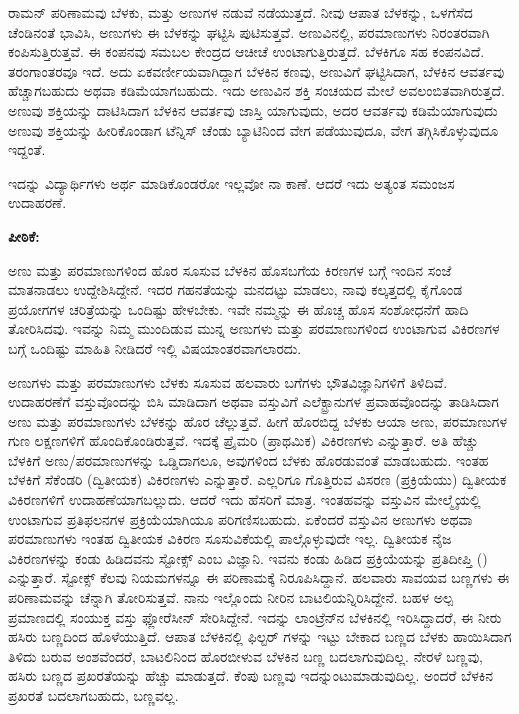 ರಾಮನ್ ಪರಿಣಾಮವು ಬೆಳಕು, ಮತ್ತು ಅಣುಗಳ ನಡುವೆ ನಡೆಯುತ್ತದೆ. ನೀವು ಆಪಾತ ಬೆಳಕನ್ನು, ಒಳಗೆಸೆದ ಚೆಂಡಿನಂತೆ ಭಾವಿಸಿ, ಅಣುಗಳು ಈ ಬೆಳಕನ್ನು ಘಟ್ಟಿಸಿ ಪುಟಿಸುತ್ತವೆ. ಅಣುವಿನಲ್ಲಿ, ಪರಮಾಣುಗಳು ನಿರಂತರವಾಗಿ ಕಂಪಿಸುತ್ತಿರುತ್ತವೆ. ಈ ಕಂಪನವು ಸಮಬಲ ಕೇಂದ್ರದ ಆಚೀಚೆ ಉಂಟಾಗುತ್ತಿರುತ್ತದೆ. ಬೆಳಕಿಗೂ ಸಹ ಕಂಪನವಿದೆ. ತರಂಗಾಂತರವೂ ಇದೆ. ಅದು ಏಕವರ್ಣೀಯವಾಗಿದ್ದಾಗ ಬೆಳಕಿನ ಕಣವು, ಅಣುವಿಗೆ ಘಟ್ಟಿಸಿದಾಗ, ಬೆಳಕಿನ ಆವರ್ತವು ಹೆಚ್ಚಾಗಬಹುದು ಅಥವಾ ಕಡಿಮೆಯಾಗಬಹುದು. ಇದು ಅಣುವಿನ ಶಕ್ತಿ ಸಂಚಯದ ಮೇಲೆ ಅವಲಂಬಿತವಾಗಿರುತ್ತದೆ. ಅಣುವು ಶಕ್ತಿಯನ್ನು ದಾಟಿಸಿದಾಗ ಬೆಳಕಿನ ಆವರ್ತವು ಜಾಸ್ತಿ ಯಾಗುವುದು, ಅದರ ಆವರ್ತವು ಕಡಿಮೆಯಾಗುವುದು  ಅಣುವು ಶಕ್ತಿಯನ್ನು ಹೀರಿಕೊಂಡಾಗ ಟೆನ್ನಿಸ್ ಚೆಂಡು ಬ್ಯಾಟಿನಿಂದ ವೇಗ ಪಡೆಯುವುದೂ, ವೇಗ ತಗ್ಗಿಸಿಕೊಳ್ಳುವುದೂ ಇದ್ದಂತೆ.

ಇದನ್ನು ವಿದ್ಯಾರ್ಥಿಗಳು ಅರ್ಥ ಮಾಡಿಕೊಂಡರೋ ಇಲ್ಲವೋ ನಾ ಕಾಣೆ. ಆದರೆ ಇದು ಅತ್ಯಂತ ಸಮಂಜಸ ಉದಾಹರಣೆ.



\textbf{ಪೀಠಿಕೆ:}

ಅಣು ಮತ್ತು ಪರಮಾಣುಗಳಿಂದ ಹೊರ ಸೂಸುವ ಬೆಳಕಿನ ಹೊಸಬಗೆಯ ಕಿರಣಗಳ ಬಗ್ಗೆ ಇಂದಿನ ಸಂಜೆ ಮಾತನಾಡಲು ಉದ್ದೇಶಿಸಿದ್ದೇನೆ. ಇದರ ಗಹನತೆಯನ್ನು ಮನದಟ್ಟು ಮಾಡಲು, ನಾವು ಕಲ್ಕತ್ತದಲ್ಲಿ ಕೈಗೊಂಡ ಪ್ರಯೋಗಗಳ ಚರಿತ್ರೆಯನ್ನು ಒಂದಿಷ್ಟು ಹೇಳಬೇಕು. ಇವೇ ನಮ್ಮನ್ನು ಈ ಹೊಚ್ಚ ಹೊಸ ಸಂಶೋಧನೆಗೆ ಹಾದಿ ತೋರಿಸಿದವು. ಇವನ್ನು ನಿಮ್ಮ ಮುಂದಿಡುವ ಮುನ್ನ ಅಣುಗಳು ಮತ್ತು ಪರಮಾಣುಗಳಿಂದ ಉಂಟಾಗುವ ವಿಕಿರಣಗಳ ಬಗ್ಗೆ ಒಂದಿಷ್ಟು ಮಾಹಿತಿ ನೀಡಿದರೆ ಇಲ್ಲಿ ವಿಷಯಾಂತರವಾಗಲಾರದು.

ಅಣುಗಳು ಮತ್ತು ಪರಮಾಣುಗಳು ಬೆಳಕು ಸೂಸುವ ಹಲವಾರು ಬಗೆಗಳು ಭೌತವಿಜ್ಞಾನಿಗಳಿಗೆ ತಿಳಿದಿವೆ. ಉದಾಹರಣೆಗೆ ವಸ್ತುವೊಂದನ್ನು ಬಿಸಿ ಮಾಡಿದಾಗ ಅಥವಾ ವಸ್ತುವಿಗೆ ಎಲೆಕ್ಟ್ರಾನುಗಳ ಪ್ರವಾಹವೊಂದನ್ನು ತಾಡಿಸಿದಾಗ ಅಣು ಮತ್ತು ಪರಮಾಣುಗಳು ಬೆಳಕನ್ನು ಹೊರ ಚೆಲ್ಲುತ್ತವೆ. ಹೀಗೆ ಹೊರಬಿದ್ದ ಬೆಳಕು ಆಯಾ ಅಣು, ಪರಮಾಣುಗಳ ಗುಣ ಲಕ್ಷಣಗಳಿಗೆ ಹೊಂದಿಕೊಂಡಿರುತ್ತವೆ. ಇದಕ್ಕೆ ಪ್ರೈಮರಿ (ಪ್ರಾಥಮಿಕ) ವಿಕಿರಣಗಳು ಎನ್ನುತ್ತಾರೆ. ಅತಿ ಹೆಚ್ಚು ಬೆಳಕಿಗೆ ಅಣು/ಪರಮಾಣುಗಳನ್ನು ಒಡ್ಡಿದಾಗಲೂ, ಅವುಗಳಿಂದ ಬೆಳಕು ಹೊರಡುವಂತೆ ಮಾಡಬಹುದು. ಇಂತಹ ಬೆಳಕಿಗೆ ಸೆಕೆಂಡರಿ (ದ್ವಿತೀಯಕ) ವಿಕಿರಣಗಳು ಎನ್ನುತ್ತಾರೆ. ಎಲ್ಲರಿಗೂ ಗೊತ್ತಿರುವ ವಿಸರಣ (ಪ್ರಕ್ರಿಯೆಯು) ದ್ವಿತೀಯಕ ವಿಕಿರಣಗಳಿಗೆ ಉದಾಹಣೆಯಾಗಬಲ್ಲುದು. ಆದರೆ ಇದು ಹೆಸರಿಗೆ ಮಾತ್ರ. ಇಂತಹವನ್ನು ವಸ್ತುವಿನ ಮೇಲ್ಮೈಯಲ್ಲಿ ಉಂಟಾಗುವ ಪ್ರತಿಫಲನಗಳ ಪ್ರಕ್ರಿಯೆಯಾಗಿಯೂ ಪರಿಗಣಿಸಬಹುದು. ಏಕೆಂದರೆ ವಸ್ತುವಿನ ಅಣುಗಳು ಅಥವಾ ಪರಮಾಣುಗಳು ಇಂತಹ ದ್ವಿತೀಯಕ ವಿಕಿರಣ ಸೂಸುವಿಕೆಯಲ್ಲಿ ಪಾಲ್ಗೊಳ್ಳುವುದೇ ಇಲ್ಲ. ದ್ವಿತೀಯಕ ನೈಜ ವಿಕಿರಣಗಳನ್ನು ಕಂಡು ಹಿಡಿದವನು ಸ್ಟೋಕ್ಸ್ ಎಂಬ ವಿಜ್ಞಾನಿ. ಇವನು ಕಂಡು ಹಿಡಿದ ಪ್ರಕ್ರಿಯೆಯನ್ನು ಪ್ರತಿದೀಪ್ತಿ () ಎನ್ನುತ್ತಾರೆ. ಸ್ಟೋಕ್ಸ್ ಕೆಲವು ನಿಯಮಗಳನ್ನೂ ಈ ಪರಿಣಾಮಕ್ಕೆ ನಿರೂಪಿಸಿದ್ದಾನೆ. ಹಲವಾರು ಸಾವಯವ ಬಣ್ಣಗಳು ಈ ಪರಿಣಾಮವನ್ನು ಚೆನ್ನಾಗಿ ತೋರಿಸುತ್ತವೆ. ನಾನು ಇಲ್ಲೊಂದು ನೀರಿನ ಬಾಟಲಿಯನ್ನಿರಿಸಿದ್ದೇನೆ. ಬಹಳ ಅಲ್ಪ ಪ್ರಮಾಣದಲ್ಲಿ ಸಂಯುಕ್ತ ವಸ್ತು ಫ್ಲೋರೆಸೀನ್ ಸೇರಿಸಿದ್ದೇನೆ. ಇದನ್ನು ಲಾಂಟ್ರೆನ್‍ನ ಬೆಳಕಿನಲ್ಲಿ ಇರಿಸಿದ್ದಾದರೆ, ಈ ನೀರು ಹಸಿರು ಬಣ್ಣದಿಂದ ಹೊಳೆಯುತ್ತಿದೆ. ಆಪಾತ ಬೆಳಕಿನಲ್ಲಿ ಫಿಲ್ಟರ್ ಗಳನ್ನು ಇಟ್ಟು ಬೇಕಾದ ಬಣ್ಣದ ಬೆಳಕು ಹಾಯಿಸಿದಾಗ ತಿಳಿದು ಬರುವ ಅಂಶವೆಂದರೆ, ಬಾಟಲಿನಿಂದ ಹೊರಬೀಳುವ ಬೆಳಕಿನ ಬಣ್ಣ ಬದಲಾಗುವುದಿಲ್ಲ. ನೇರಳೆ ಬಣ್ಣವು, ಹಸಿರು ಬಣ್ಣದ ಪ್ರಖರತೆಯನ್ನು ಹೆಚ್ಚು ಮಾಡುತ್ತದೆ. ಕೆಂಪು ಬಣ್ಣವು ಇದನ್ನುಂಟುಮಾಡುವುದಿಲ್ಲ. ಅಂದರೆ ಬೆಳಕಿನ ಪ್ರಖರತೆ ಬದಲಾಗಬಹುದು, ಬಣ್ಣವಲ್ಲ.

